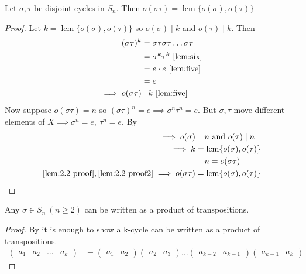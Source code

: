 \begin{lemma}
Let \(\sigma, \tau\) be disjoint cycles in \(S_n\).
Then \(o(\sigma \tau) = \operatorname{lcm} \{ o(\sigma), o(\tau) \}\)
\end{lemma}

\begin{proof}
Let \(k = \operatorname{lcm} \{ o(\sigma), o(\tau) \}\) so \(o(\sigma) \mid k\) and \(o(\tau) \mid k\).
Then \begin{align}
    (\sigma \tau)^k &= \sigma \tau \sigma \tau \ldots \sigma \tau \notag\\
    &= \sigma^k \tau^k \ \Cref{lem:six} \notag \\
    &= e \cdot e \ \Cref{lem:five} \notag\\
    &= e \notag \\
    \implies o(\sigma \tau) &\mid k \ \Cref{lem:five} \label{lem:2.2-proof}
\end{align}
Now suppose \(o(\sigma \tau) = n\) so \((\sigma \tau)^n = e \implies \sigma^n \tau^n = e\).
But \(\sigma, \tau\) move different elements of \(X \implies \sigma^n = e,\ \tau^n = e\).
By 
\begin{align}
    \implies o(\sigma) &\;\mid n \text{ and } o(\tau) \mid n \notag\\
    \implies k &= \operatorname{lcm} \{ o(\sigma), o(\tau) \} \notag\\
    &\;\mid n = o(\sigma \tau) \label{lem:2.2-proof2} \\
    \cref{lem:2.2-proof}, \cref{lem:2.2-proof2} \implies o(\sigma \tau) &= \operatorname{lcm} \{ o(\sigma), o(\tau) \} \notag
\end{align}
\end{proof}

\begin{proposition}
Any \(\sigma \in S_n \ (n \geq 2)\) can be written as a product of transpositions.
\end{proposition}

\begin{proof}
By  it is enough to show a k-cycle can be written as a product of transpositions.
\begin{align*}
    \begin{pmatrix}a_1 & a_2 & \ldots & a_k \end{pmatrix}
    &= \begin{pmatrix}a_1 & a_2\end{pmatrix} \begin{pmatrix}a_2 & a_3\end{pmatrix} \ldots \begin{pmatrix}a_{k-2} & a_{k-1}\end{pmatrix} \begin{pmatrix}a_{k-1} & a_k\end{pmatrix}
\end{align*}
\end{proof}

